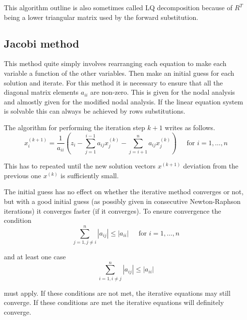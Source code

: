 This algorithm outline is also sometimes called LQ decomposition
because of $R^T$ being a lower triangular matrix used by the forward
substitution.

\subsection{Jacobi method}

This method quite simply involves rearranging each equation to make
each variable a function of the other variables.  Then make an initial
guess for each solution and iterate.  For this method it is necessary
to ensure that all the diagonal matrix elements $a_{ii}$ are non-zero.
This is given for the nodal analysis and almostly given for the
modified nodal analysis.  If the linear equation system is solvable
this can always be achieved by rows substitutions.

\addvspace{12pt}

The algorithm for performing the iteration step $k + 1$ writes as
follows.
\begin{equation}
x_{i}^{(k+1)} = \dfrac{1}{a_{ii}}\left(z_i - \sum_{j=1}^{i-1} a_{ij}x_{j}^{(k)} - \sum_{j=i+1}^{n} a_{ij}x_{j}^{(k)}\right)
\;\;\;\; \textrm{ for } i = 1, \ldots, n
\end{equation}

This has to repeated until the new solution vectors $x^{(k+1)}$
deviation from the previous one $x^{(k)}$ is sufficiently small.

\addvspace{12pt}

The initial guess has no effect on whether the iterative method
converges or not, but with a good initial guess (as possibly given in
consecutive Newton-Raphson iterations) it converges faster (if it
converges).  To ensure convergence the condition
\begin{equation}
\sum_{j = 1, j \ne i}^{n} \left|a_{ij}\right| \le \left|a_{ii}\right|
\;\;\;\; \textrm{ for } i = 1, \ldots, n
\end{equation}

and at least one case
\begin{equation}
\sum_{i = 1, i \ne j}^{n} \left|a_{ij}\right| \le \left|a_{ii}\right|
\end{equation}

must apply.  If these conditions are not met, the iterative equations
may still converge.  If these conditions are met the iterative
equations will definitely converge.

